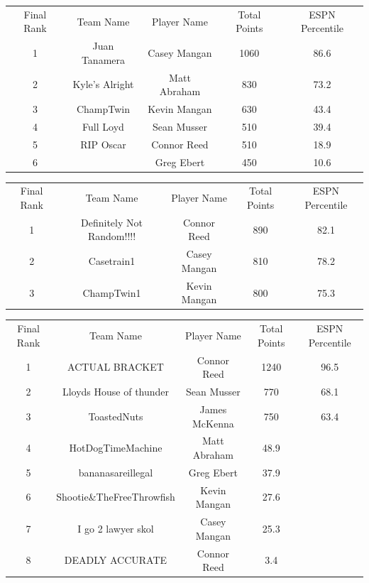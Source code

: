 \documentclass[11pt,letterpaper]{article}
\begin{document}
\vspace{-25pt}
\begin{table} [h]
\begin{center}
\begin{tabular} { c c c c c }
\\ Final Rank & Team Name & Player Name & Total Points & ESPN Percentile
\\ 1  & Juan Tanamera & Casey Mangan & 1060 & 86.6
\\ 2 & Kyle's Alright & Matt Abraham & 830 & 73.2
\\ 3 & ChampTwin & Kevin Mangan & 630 & 43.4
\\ 4 & Full Loyd & Sean Musser & 510 & 39.4
\\ 5 & RIP Oscar & Connor Reed & 510 & 18.9
\\ 6 &  & Greg Ebert & 450 & 10.6
\end{tabular}
\end{center}
\end{table}

\vspace{-25pt}
\begin{table} [h]
\begin{center}
\begin{tabular} { c c c c c }
\\ Final Rank & Team Name & Player Name & Total Points & ESPN Percentile
\\ 1 & Definitely Not Random!!!! & Connor Reed & 890 & 82.1
\\ 2 & Casetrain1 & Casey Mangan & 810 & 78.2
\\ 3 & ChampTwin1 & Kevin Mangan & 800 & 75.3
\end{tabular}
\end{center}
\end{table}

\newpage
{}
\vspace{-25pt}
\begin{table} [h]
\begin{center}
\begin{tabular} { c c c c c }
\\ Final Rank & Team Name & Player Name & Total Points & ESPN Percentile
\\ 1 & ACTUAL BRACKET & Connor Reed & 1240 & 96.5
\\ 2 & Lloyds House of thunder & Sean Musser & 770 & 68.1
\\ 3 & ToastedNuts & James McKenna & 750 & 63.4
\\ 4 & HotDogTimeMachine & Matt Abraham & 48.9
\\ 5 & bananasareillegal & Greg Ebert & 37.9
\\ 6 & Shootie\&TheFreeThrowfish & Kevin Mangan & 27.6
\\ 7 & I go 2 lawyer skol & Casey Mangan & 25.3
\\ 8 & DEADLY ACCURATE & Connor Reed & 3.4 
\end{tabular}
\end{center}
\end{table}
\end{document}
